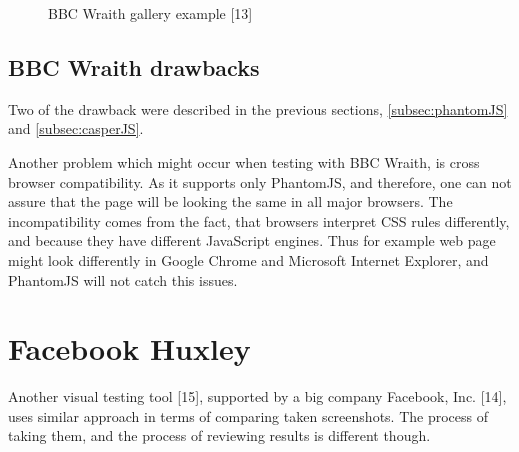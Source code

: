 \documentclass[11pt,oneside,final]{fithesis2}
\begin{document}
  
  \begin{figure}[!htb]
    \begin{center}
    \leavevmode
    \centerline{}
    \end{center}
    \caption{BBC Wraith gallery example [13]}
    \label{fig:bbcGallery} 
  \end{figure}

    \subsection{BBC Wraith drawbacks}
    Two of the drawback were described in the previous sections, \ref{subsec:phantomJS} and \ref{subsec:casperJS}.
    
    Another problem which might occur when testing with BBC Wraith, is cross browser compatibility. As it supports only PhantomJS, and therefore, one can not assure that the page will be 
    looking the same in all major browsers. The incompatibility comes from the fact, that browsers interpret CSS rules differently, and because they have different JavaScript engines. 
    Thus for example web page might look differently in Google Chrome and Microsoft Internet Explorer, and PhantomJS will not catch this issues.

  \section{Facebook Huxley}
  Another visual testing tool [15], supported by a big company Facebook, Inc. [14], uses similar approach in terms of comparing taken screenshots. The process of taking them, and the process
  of reviewing results is different though.
  
\end{document}
